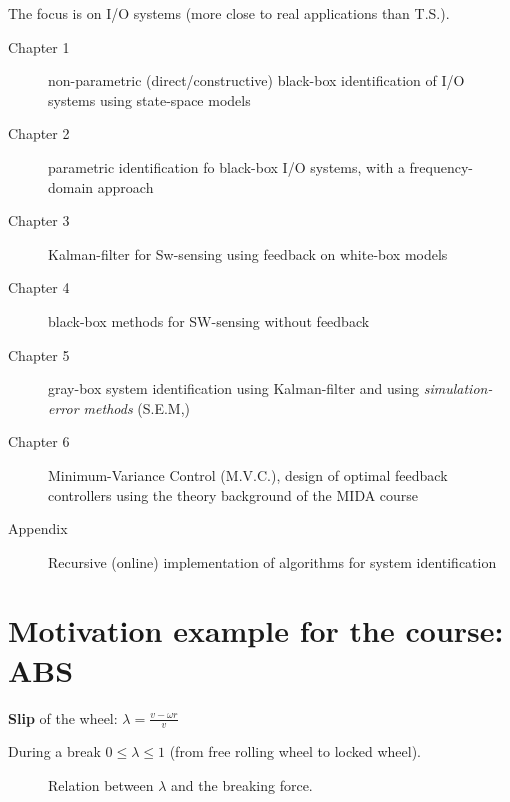 The focus is on I/O systems (more close to real applications than T.S.).

\begin{description}
    \item[Chapter 1] non-parametric (direct/constructive) black-box identification of I/O systems using state-space models
    \item[Chapter 2] parametric identification fo black-box I/O systems, with a frequency-domain approach
    \item[Chapter 3] Kalman-filter for Sw-sensing using feedback on white-box models
    \item[Chapter 4] black-box methods for SW-sensing without feedback
    \item[Chapter 5] gray-box system identification using Kalman-filter and using \emph{simulation-error methods} (S.E.M,)
    \item[Chapter 6] Minimum-Variance Control (M.V.C.), design of optimal feedback controllers using the theory background of the MIDA course
    \item[Appendix] Recursive (online) implementation of algorithms for system identification
\end{description}

\section{Motivation example for the course: ABS}

\begin{defn}
    \textbf{Slip} of the wheel: $\lambda = \frac{v-\omega r}{v}$
\end{defn}

During a break $0 \le \lambda \le 1$ (from free rolling wheel to locked wheel).
\begin{figure}[H]
    \centering
    \caption*{Relation between $\lambda$ and the breaking force.}
\end{figure}

